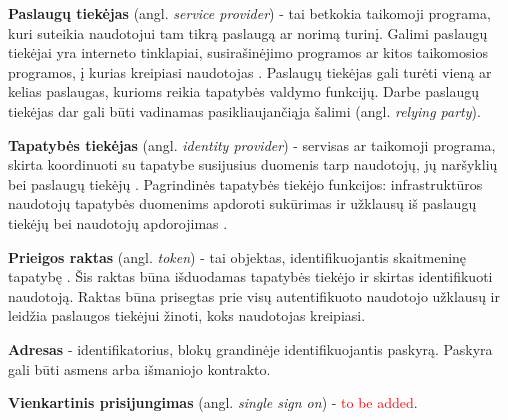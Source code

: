 \textbf{Paslaugų tiekėjas} (angl. \textit{service provider}) - tai betkokia taikomoji programa, kuri suteikia naudotojui tam tikrą paslaugą ar
norimą turinį. Galimi paslaugų tiekėjai yra interneto tinklapiai, susirašinėjimo programos ar kitos taikomosios programos,
į kurias kreipiasi naudotojas \cite{Pashalidis2003, Samar1999}. Paslaugų tiekėjas gali turėti vieną ar kelias paslaugas,
kurioms reikia tapatybės valdymo funkcijų. Darbe paslaugų tiekėjas dar gali būti vadinamas pasikliaujančiąja šalimi (angl.
\textit{relying party}).

\textbf{Tapatybės tiekėjas} (angl. \textit{identity provider}) - servisas ar taikomoji programa, skirta koordinuoti su tapatybe
susijusius duomenis tarp naudotojų, jų naršyklių bei paslaugų tiekėjų \cite{Strictest2011}. Pagrindinės tapatybės tiekėjo funkcijos:
infrastruktūros naudotojų tapatybės duomenims apdoroti sukūrimas ir užklausų iš paslaugų tiekėjų bei naudotojų apdorojimas \cite{Cao2010}.

\textbf{Prieigos raktas} (angl. \textit{token}) - tai objektas, identifikuojantis skaitmeninę tapatybę \cite{TokenDefinition}.
Šis raktas būna išduodamas tapatybės tiekėjo ir skirtas identifikuoti naudotoją. Raktas
būna prisegtas prie visų autentifikuoto naudotojo užklausų ir leidžia paslaugos tiekėjui žinoti, koks naudotojas kreipiasi.

\textbf{Adresas} - identifikatorius, blokų grandinėje identifikuojantis paskyrą. Paskyra gali būti asmens arba
išmaniojo kontrakto.

\textbf{Vienkartinis prisijungimas} (angl. \textit{single sign on}) - \textcolor{red}{to be added}.